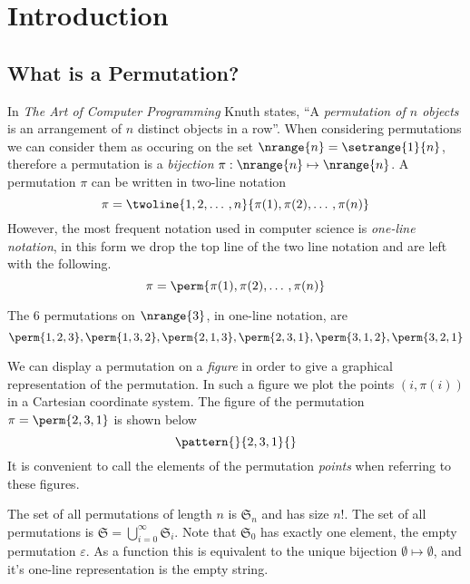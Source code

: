 \chapter{Introduction\label{cha:introduction}}
\section{What is a Permutation?}
In \emph{The Art of Computer Programming} \cite[p.~45]{Knuth:1997:ACP:260999} Knuth states,
\enquote{A \emph{permutation of \(n\) objects} is an arrangement of \(n\) distinct
objects in a row}. When considering permutations we can consider them as
occuring on the set \(\nrange{n} = \setrange{1}{n}\), therefore a permutation
is a \emph{bijection} \(\pi:\nrange{n} \mapsto \nrange{n}\). A
permutation \(\pi\) can be written in two-line notation
\begin{equation*}
\pi = \twoline{1,2,\dotso,n}{\pi(1),\pi(2),\dotso,\pi(n)}
\end{equation*}
However, the most frequent notation used in computer science is
\emph{one-line notation}, in this form we drop the top line of the two line
notation and are left with the following.
\begin{equation*}
\pi = \perm{\pi(1),\pi(2),\dotso,\pi(n)}
\end{equation*}

\begin{example}
The 6 permutations on \(\nrange{3}\), in one-line notation, are
\begin{equation*}
\perm{1,2,3},\perm{1,3,2},\perm{2,1,3},\perm{2,3,1}, \perm{3,1,2}, \perm{3,2,1}
\end{equation*}
\end{example}

We can display a permutation on a \emph{figure} in order to give a graphical
representation of the permutation. In such a figure we plot the points
\((i,\pi(i))\) in a Cartesian coordinate system. The figure of the permutation
\(\pi = \perm{2,3,1}\) is shown below
\begin{equation*}
    \pattern{}{2,3,1}{}
\end{equation*}
It is convenient to call the elements of the permutation \emph{points} when
referring to these figures.

The set of all permutations of length \(n\) is \(\mathfrak{S}_n\) and
has size \(n!\). The set of all permutations is
\(\mathfrak{S}=\bigcup_{i=0}^{\infty}\mathfrak{S}_i\). Note that \(\mathfrak{S}_0\)
has exactly one element, the empty permutation \(\varepsilon\). As a function
this is equivalent to the unique bijection \(\emptyset \mapsto \emptyset\), and
it's one-line representation is the empty string.

